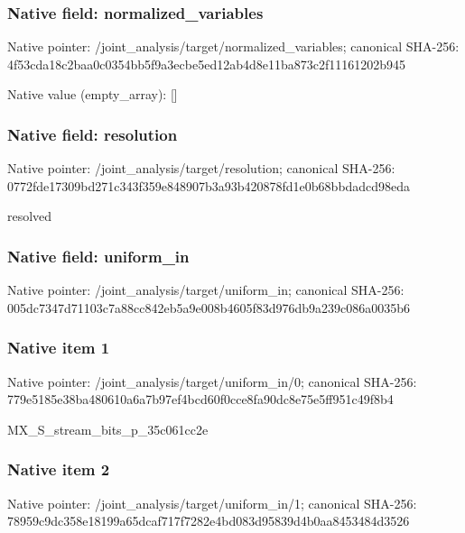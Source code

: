 \documentclass[10pt,a4paper]{article}
\begin{document}
\subsubsection{Native field: normalized\_\allowbreak{}variables}
Native pointer: /joint\_\allowbreak{}analysis/target/normalized\_\allowbreak{}variables; canonical SHA-256: 4f53cda18c2baa0c0354bb5f9a3ecbe5ed12ab4d8e11ba873c2f11161202b945

Native value (empty\_\allowbreak{}array): []

\subsubsection{Native field: resolution}
Native pointer: /joint\_\allowbreak{}analysis/target/resolution; canonical SHA-256: 0772fde17309bd271c343f359e848907b3a93b420878fd1e0b68bbdadcd98eda

\begingroup\raggedright\sloppy resolved\par\endgroup

\subsubsection{Native field: uniform\_\allowbreak{}in}
Native pointer: /joint\_\allowbreak{}analysis/target/uniform\_\allowbreak{}in; canonical SHA-256: 005dc7347d71103c7a88cc842eb5a9e008b4605f83d976db9a239c086a0035b6

\subsubsection{Native item 1}
Native pointer: /joint\_\allowbreak{}analysis/target/uniform\_\allowbreak{}in/0; canonical SHA-256: 779e5185e38ba480610a6a7b97ef4bcd60f0cce8fa90dc8e75e5ff951c49f8b4

\begingroup\raggedright\sloppy MX\_\allowbreak{}S\_\allowbreak{}stream\_\allowbreak{}bits\_\allowbreak{}p\_\allowbreak{}35c061cc2e\par\endgroup

\subsubsection{Native item 2}
Native pointer: /joint\_\allowbreak{}analysis/target/uniform\_\allowbreak{}in/1; canonical SHA-256: 78959c9dc358e18199a65dcaf717f7282e4bd083d95839d4b0aa8453484d3526
\end{document}
